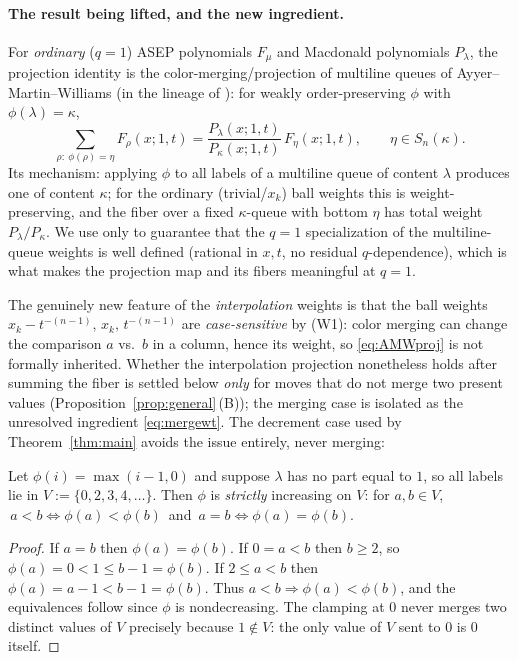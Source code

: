 \paragraph{The result being lifted, and the new ingredient.}
For \emph{ordinary} ($q=1$) ASEP polynomials $F_\mu$ and Macdonald polynomials
$P_\lambda$, the projection identity is the color-merging/projection of multiline
queues of Ayyer--Martin--Williams \cite[Prop.~6.1]{AMW25} (in the lineage of
\cite[\S5]{CMW22}): for weakly order-preserving $\phi$ with $\phi(\lambda)=\kappa$,
\begin{equation}\label{eq:AMWproj}
\sum_{\rho:\ \phi(\rho)=\eta}F_\rho(x;1,t)=\frac{P_\lambda(x;1,t)}{P_\kappa(x;1,t)}\,F_\eta(x;1,t),
\qquad \eta\in S_n(\kappa).
\end{equation}
Its mechanism: applying $\phi$ to all labels of a multiline queue of content
$\lambda$ produces one of content $\kappa$; for the ordinary (trivial/$x_k$) ball
weights this is weight-preserving, and the fiber over a fixed $\kappa$-queue with
bottom $\eta$ has total weight $P_\lambda/P_\kappa$. We use \cite[Thm.~1.1]{AS19}
only to guarantee that the $q=1$ specialization of the multiline-queue weights is
well defined (rational in $x,t$, no residual $q$-dependence), which is what makes
the projection map and its fibers meaningful at $q=1$.

The genuinely new feature of the \emph{interpolation} weights is that the ball
weights $x_k-t^{-(n-1)},\,x_k,\,t^{-(n-1)}$ are \emph{case-sensitive} by (W1):
color merging can change the comparison $a$ vs.\ $b$ in a column, hence its weight,
so \eqref{eq:AMWproj} is not formally inherited. Whether the interpolation
projection nonetheless holds after summing the fiber is settled below \emph{only}
for moves that do not merge two present values
(Proposition~\ref{prop:general}\,\textup{(B)}); the merging case is isolated as the
unresolved ingredient \eqref{eq:mergewt}. The decrement case used by
Theorem~\ref{thm:main} avoids the issue entirely, never merging:

\begin{qthreelemma}\label{lem:strict}
Let $\phi(i)=\max(i-1,0)$ and suppose $\lambda$ has no part equal to $1$, so all
labels lie in $V:=\{0,2,3,4,\dots\}$. Then $\phi$ is \emph{strictly} increasing on
$V$: for $a,b\in V$, $\,a<b\iff\phi(a)<\phi(b)\,$ and $\,a=b\iff\phi(a)=\phi(b)$.
\end{qthreelemma}

\begin{proof}
If $a=b$ then $\phi(a)=\phi(b)$. If $0=a<b$ then $b\ge2$, so
$\phi(a)=0<1\le b-1=\phi(b)$. If $2\le a<b$ then $\phi(a)=a-1<b-1=\phi(b)$. Thus
$a<b\Rightarrow\phi(a)<\phi(b)$, and the equivalences follow since $\phi$ is
nondecreasing. The clamping at $0$ never merges two distinct values of $V$
precisely because $1\notin V$: the only value of $V$ sent to $0$ is $0$ itself.
\end{proof}

